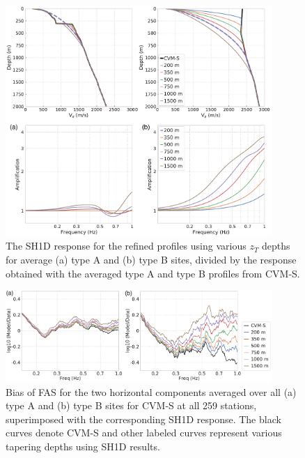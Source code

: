 \clearpage
\begin{figure}[!ht]
  \centering
  \includegraphics[width=0.9\textwidth]{figures/figure_vs30_7.pdf}
  \caption{The SH1D response for the refined profiles using various $z_T$ depths for average (a) type A and (b) type B sites, divided by the response obtained with the averaged type A and type B profiles from CVM-S.}
  \label{fig:vs30-7}
\end{figure}

\clearpage
\begin{figure}[!ht]
  \centering
  \includegraphics[width=0.9\textwidth]{figures/figure_vs30_8.pdf}
  \caption{Bias of FAS for the two horizontal components averaged over all (a) type A and (b) type B sites for CVM-S at all 259 stations, superimposed with the corresponding SH1D response. The black curves denote CVM-S and other labeled curves represent various tapering depths using SH1D results.}
  \label{fig:vs30-8}
\end{figure}

